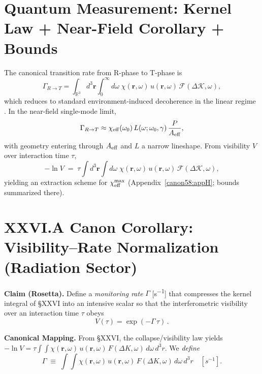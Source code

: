 \documentclass[10pt,reprint,aps,onecolumn,nofootinbib]{revtex4-2}
\begin{document}
    \section{Quantum Measurement: Kernel Law + Near-Field Corollary + Bounds}\label{canon58:measurement}
    The canonical transition rate from R-phase to T-phase is
    \begin{equation}
    \Gamma_{R\to T}
    =\int_{\mathbb{R}^3}\! d^3\mathbf r \int_{0}^{\infty}\! d\omega\;
    \chi(\mathbf r,\omega)\,u(\mathbf r,\omega)\,\mathcal F(\Delta\mathcal K,\omega),
    \label{eq:kernel}
    \end{equation}
    which reduces to standard environment-induced decoherence in the linear regime \cite{Zurek2003}.
    In the near-field single-mode limit,
    \[
        \Gamma_{R\to T}\approx \chi_{\rm eff}(\omega_0)\,L(\omega;\omega_0,\gamma)\,\frac{P}{A_{\rm eff}},
    \]
    with geometry entering through $A_{\rm eff}$ and $L$ a narrow lineshape. From visibility $V$ over interaction time $\tau$,
    \[
        -\ln V \;=\; \tau \int d^3\mathbf r \int d\omega\;\chi(\mathbf r,\omega)\,u(\mathbf r,\omega)\,\mathcal F(\Delta\mathcal K,\omega),
    \]
    yielding an extraction scheme for $\chi_{\rm eff}^{\max}$ (Appendix~\ref{canon58:appH}; bounds summarized there). %



    \section*{XXVI.A Canon Corollary: Visibility–Rate Normalization (Radiation Sector)}

    \textbf{Claim (Rosetta).}
    Define a \emph{monitoring rate} $\Gamma$ [\si{s^{-1}}] that compresses the kernel integral of §XXVI into an intensive scalar so that the interferometric visibility over an interaction time $\tau$ obeys
    \[
        V(\tau)=\exp(-\Gamma\,\tau)\,.
    \]

    \textbf{Canonical Mapping.}
    From §XXVI, the collapse/visibility law yields $-\ln V = \tau\!\int\!\!\int \chi(\mathbf r,\omega)\,u(\mathbf r,\omega)\,F(\Delta K,\omega)\, d\omega\, d^3r$. We \emph{define}
    \[
        \Gamma \;\equiv\; \int\!\!\int \chi(\mathbf r,\omega)\,u(\mathbf r,\omega)\,F(\Delta K,\omega)\, d\omega\, d^3r \quad[\si{s^{-1}}] .
    \]
\end{document}
